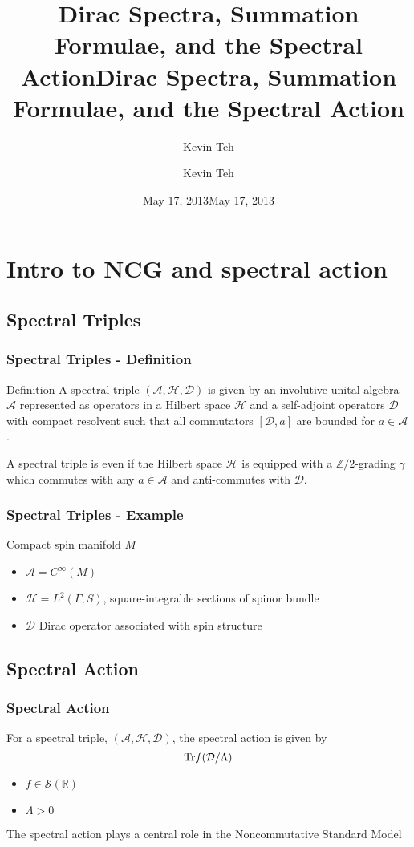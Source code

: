 \documentclass{beamer}
\title{Dirac Spectra, Summation Formulae, and the Spectral Action} \author{Kevin Teh} \date{May 17, 2013}
\title{Dirac Spectra, Summation Formulae, and the Spectral Action}
\author{Kevin Teh}
\institute{Caltech}
\date{May 17, 2013}
\def\Z{{\mathbb Z}}
\def\R{{\mathbb R}}
\def\cA{{\mathcal A}}
\def\cD{{\mathcal D}}
\def\cH{{\mathcal H}}
\def\Tr{{\rm Tr}}
\begin{document}
\begin{frame}
\titlepage
\end{frame}

\section{Intro to NCG and spectral action}

\subsection{Spectral Triples}
\begin{frame}
\frametitle{Spectral Triples - Definition}
\begin{block}{Definition}
A spectral triple $(\cA, \cH, \cD)$ is given by an involutive unital algebra $\cA$ represented as operators in a Hilbert space $\cH$ and a self-adjoint operators $\cD$ with compact resolvent such that all commutators $[\cD, a]$ are bounded for $a \in \cA$.
\end{block}
\pause

\begin{block}{}
A spectral triple is even if the Hilbert space $\cH$ is equipped with a $\Z /2 $-grading $\gamma$ which commutes with any $a \in \cA$ and anti-commutes with $\cD$.
\end{block}
\end{frame}


\begin{frame}
\frametitle{Spectral Triples - Example}
\begin{exampleblock}{Compact spin manifold $M$}
\begin{itemize}
\item $\cA = C^{\infty}(M)$
\item $\cH = L^2(\Gamma, S)$, square-integrable sections of spinor bundle
\item $\cD$ Dirac operator associated with spin structure
\end{itemize}
\end{exampleblock}
\end{frame}
\subsection{Spectral Action}

\begin{frame}
\frametitle{Spectral Action}

For a spectral triple, $(\cA, \cH, \cD)$, the spectral action is given by
\[
\Tr f(\cD / \Lambda)
\]

\pause

\begin{itemize}
\item $f \in \mathcal{S} (\R)$
\item $\Lambda > 0$
\end{itemize}

\pause

The spectral action plays a central role in the Noncommutative Standard Model
\end{frame}
\end{document}
